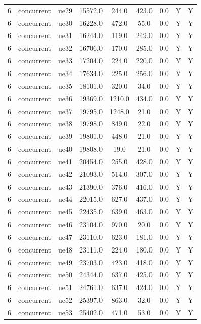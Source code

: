 \begin{table}[ht]
\begin{tabular}{|c|c|c|c|c|c|c|c|c|}
6 & concurrent & ue29 & 15572.0 & 244.0 & 423.0 & 0.0 & Y & Y \\
6 & concurrent & ue30 & 16228.0 & 472.0 & 55.0 & 0.0 & Y & Y \\
6 & concurrent & ue31 & 16244.0 & 119.0 & 249.0 & 0.0 & Y & Y \\
6 & concurrent & ue32 & 16706.0 & 170.0 & 285.0 & 0.0 & Y & Y \\
6 & concurrent & ue33 & 17204.0 & 224.0 & 220.0 & 0.0 & Y & Y \\
6 & concurrent & ue34 & 17634.0 & 225.0 & 256.0 & 0.0 & Y & Y \\
6 & concurrent & ue35 & 18101.0 & 320.0 & 34.0 & 0.0 & Y & Y \\
6 & concurrent & ue36 & 19369.0 & 1210.0 & 434.0 & 0.0 & Y & Y \\
6 & concurrent & ue37 & 19795.0 & 1248.0 & 21.0 & 0.0 & Y & Y \\
6 & concurrent & ue38 & 19798.0 & 849.0 & 22.0 & 0.0 & Y & Y \\
6 & concurrent & ue39 & 19801.0 & 448.0 & 21.0 & 0.0 & Y & Y \\
6 & concurrent & ue40 & 19808.0 & 19.0 & 21.0 & 0.0 & Y & Y \\
6 & concurrent & ue41 & 20454.0 & 255.0 & 428.0 & 0.0 & Y & Y \\
6 & concurrent & ue42 & 21093.0 & 514.0 & 307.0 & 0.0 & Y & Y \\
6 & concurrent & ue43 & 21390.0 & 376.0 & 416.0 & 0.0 & Y & Y \\
6 & concurrent & ue44 & 22015.0 & 627.0 & 437.0 & 0.0 & Y & Y \\
6 & concurrent & ue45 & 22435.0 & 639.0 & 463.0 & 0.0 & Y & Y \\
6 & concurrent & ue46 & 23104.0 & 970.0 & 20.0 & 0.0 & Y & Y \\
6 & concurrent & ue47 & 23110.0 & 623.0 & 181.0 & 0.0 & Y & Y \\
6 & concurrent & ue48 & 23111.0 & 224.0 & 180.0 & 0.0 & Y & Y \\
6 & concurrent & ue49 & 23703.0 & 423.0 & 418.0 & 0.0 & Y & Y \\
6 & concurrent & ue50 & 24344.0 & 637.0 & 425.0 & 0.0 & Y & Y \\
6 & concurrent & ue51 & 24761.0 & 637.0 & 424.0 & 0.0 & Y & Y \\
6 & concurrent & ue52 & 25397.0 & 863.0 & 32.0 & 0.0 & Y & Y \\
6 & concurrent & ue53 & 25402.0 & 471.0 & 53.0 & 0.0 & Y & Y \\

\end{tabular}
\end{table}

